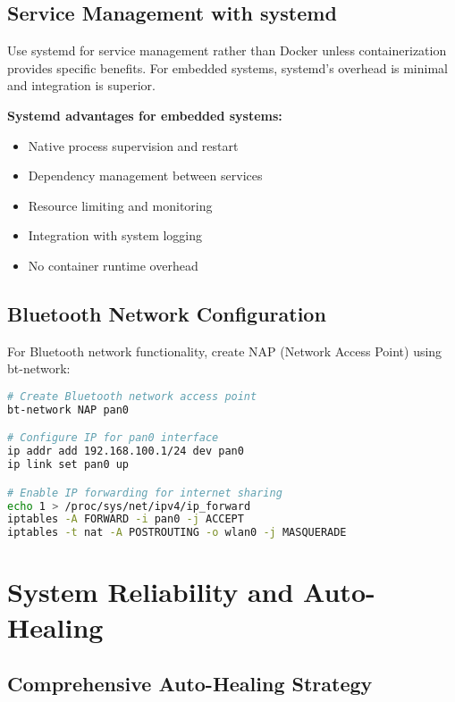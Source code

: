 \subsection{Service Management with systemd}

Use systemd for service management rather than Docker unless containerization provides specific benefits. For embedded systems, systemd's overhead is minimal and integration is superior.

\textbf{Systemd advantages for embedded systems:}
\begin{itemize}
\item Native process supervision and restart
\item Dependency management between services
\item Resource limiting and monitoring
\item Integration with system logging
\item No container runtime overhead
\end{itemize}

\subsection{Bluetooth Network Configuration}

For Bluetooth network functionality, create NAP (Network Access Point) using bt-network:

\begin{tcolorbox}[colback=gray!5,colframe=gray!50,title=Bluetooth NAP Setup]
\begin{lstlisting}[language=bash,basicstyle=\small\ttfamily]
# Create Bluetooth network access point
bt-network NAP pan0

# Configure IP for pan0 interface
ip addr add 192.168.100.1/24 dev pan0
ip link set pan0 up

# Enable IP forwarding for internet sharing
echo 1 > /proc/sys/net/ipv4/ip_forward
iptables -A FORWARD -i pan0 -j ACCEPT
iptables -t nat -A POSTROUTING -o wlan0 -j MASQUERADE
\end{lstlisting}
\end{tcolorbox}

\section{System Reliability and Auto-Healing}

\subsection{Comprehensive Auto-Healing Strategy}

